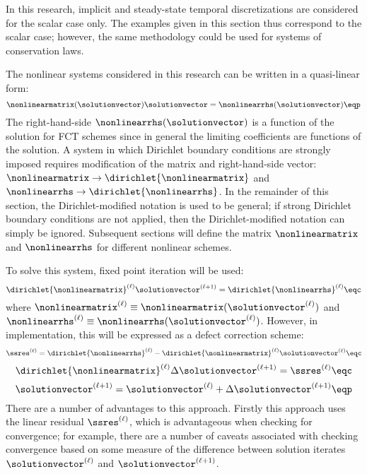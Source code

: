 In this research, implicit and steady-state temporal discretizations are
considered for the scalar case only. The examples given in this section thus
correspond to the scalar case; however, the same methodology could be used
for systems of conservation laws.

The nonlinear systems considered in this research can be written in a quasi-linear
form:
\begin{equation}\label{eq:nonlinear_equation}
  \nonlinearmatrix(\solutionvector)\solutionvector
    = \nonlinearrhs(\solutionvector) \eqp
\end{equation}
The right-hand-side $\nonlinearrhs(\solutionvector)$ is a function of
the solution for FCT schemes since in general the limiting coefficients are
functions of the solution.
A system in which Dirichlet boundary conditions are strongly imposed
requires modification of the matrix and right-hand-side vector:
$\nonlinearmatrix\rightarrow\dirichlet{\nonlinearmatrix}$ and
$\nonlinearrhs\rightarrow\dirichlet{\nonlinearrhs}$. In the remainder of
this section, the Dirichlet-modified notation is used to be general;
if strong Dirichlet boundary conditions are not applied, then the
Dirichlet-modified notation can simply be ignored. Subsequent sections
will define the matrix $\nonlinearmatrix$ and $\nonlinearrhs$ for different
nonlinear schemes.

To solve this system, fixed point iteration will be used:
\begin{equation}
  \dirichlet{\nonlinearmatrix}^{(\ell)}\solutionvector^{(\ell+1)}
    = \dirichlet{\nonlinearrhs}^{(\ell)} \eqc
\end{equation}
where $\nonlinearmatrix^{(\ell)}\equiv\nonlinearmatrix(\solutionvector^{(\ell)})$
and $\nonlinearrhs^{(\ell)}\equiv\nonlinearrhs(\solutionvector^{(\ell)})$.
However, in implementation, this will be expressed as a defect correction scheme:
\begin{equation}
  \ssres^{(\ell)} = \dirichlet{\nonlinearrhs}^{(\ell)}
    - \dirichlet{\nonlinearmatrix}^{(\ell)}\solutionvector^{(\ell)} \eqc
\end{equation}
\begin{equation}
  \dirichlet{\nonlinearmatrix}^{(\ell)}\Delta\solutionvector^{(\ell+1)}
    = \ssres^{(\ell)} \eqc
\end{equation}
\begin{equation}
  \solutionvector^{(\ell+1)} = \solutionvector^{(\ell)}
    + \Delta\solutionvector^{(\ell+1)} \eqp
\end{equation}
There are a number of advantages to this approach. Firstly this approach uses
the linear residual $\ssres^{(\ell)}$, which is advantageous when checking
for convergence; for example, there are a number of caveats associated with
checking convergence based on some measure of the difference between solution
iterates $\solutionvector^{(\ell)}$ and $\solutionvector^{(\ell+1)}$.

